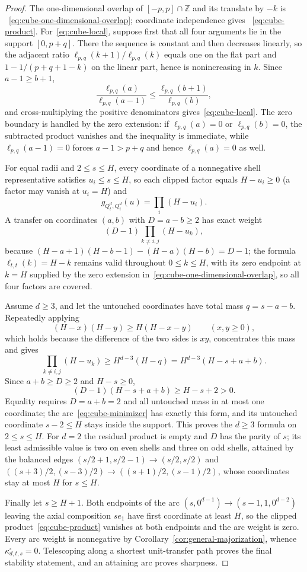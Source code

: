\documentclass[pdflatex,sn-mathphys-num]{sn-jnl}
\theoremstyle{thmstyleone}
\theoremstyle{thmstylethree}
\theoremstyle{thmstyletwo}
\newcommand{\Z}{\mathbb Z}
\begin{document}
\begin{proof}
The one-dimensional overlap of $[-p,p]\cap\Z$ and its translate by $-k$ is
~\eqref{eq:cube-one-dimensional-overlap}; coordinate independence gives
~\eqref{eq:cube-product}.  For~\eqref{eq:cube-local}, suppose first that all
four arguments lie in the support $[0,p+q]$.  There the sequence is constant
and then decreases linearly, so the adjacent ratio
$\ell_{p,q}(k+1)/\ell_{p,q}(k)$ equals one on the flat part and
$1-1/(p+q+1-k)$ on the linear part, hence is nonincreasing in $k$.  Since
$a-1\ge b+1$,
\[
 \frac{\ell_{p,q}(a)}{\ell_{p,q}(a-1)}
 \le\frac{\ell_{p,q}(b+1)}{\ell_{p,q}(b)},
\]
and cross-multiplying the positive denominators gives~\eqref{eq:cube-local}.
The zero boundary is handled by the zero extension: if $\ell_{p,q}(a)=0$ or
$\ell_{p,q}(b)=0$, the subtracted product vanishes and the inequality is
immediate, while $\ell_{p,q}(a-1)=0$ forces $a-1>p+q$ and hence
$\ell_{p,q}(a)=0$ as well.

For equal radii and $2\le s\le H$, every coordinate of a nonnegative shell
representative satisfies $u_i\le s\le H$, so each clipped factor equals
$H-u_i\ge0$ (a factor may vanish at $u_i=H$) and
\[
 g_{Q_t^d,Q_t^d}(u)=\prod_i(H-u_i).
\]
A transfer on coordinates $(a,b)$
with $D=a-b\ge2$ has exact weight
\begin{equation}
 (D-1)\prod_{k\ne i,j}(H-u_k),                       \label{eq:cube-edge-weight}
\end{equation}
because
$(H-a+1)(H-b-1)-(H-a)(H-b)=D-1$; the formula $\ell_{t,t}(k)=H-k$ remains
valid throughout $0\le k\le H$, with its zero endpoint at $k=H$ supplied by
the zero extension in~\eqref{eq:cube-one-dimensional-overlap}, so all four
factors are covered.

Assume $d\ge3$, and let the untouched coordinates have total mass
$q=s-a-b$.  Repeatedly applying
\[
 (H-x)(H-y)\ge H(H-x-y)
 \qquad(x,y\ge0),
\]
which holds because the difference of the two sides is $xy$,
concentrates this mass and gives
\[
 \prod_{k\ne i,j}(H-u_k)
 \ge H^{d-3}(H-q)=H^{d-3}(H-s+a+b).
\]
Since $a+b\ge D\ge2$ and $H-s\ge0$,
\[
 (D-1)(H-s+a+b)\ge H-s+2>0.
\]
Equality requires $D=a+b=2$ and all untouched mass in at most one coordinate;
the arc~\eqref{eq:cube-minimizer} has exactly this form, and its untouched
coordinate $s-2\le H$ stays inside the support.  This proves the
$d\ge3$ formula on $2\le s\le H$.  For $d=2$ the residual product is empty
and $D$ has the parity of $s$; its least admissible value is two on even
shells and three on odd shells, attained by the balanced edges
$(s/2+1,s/2-1)\to(s/2,s/2)$ and
$((s+3)/2,(s-3)/2)\to((s+1)/2,(s-1)/2)$, whose coordinates stay at most
$H$ for $s\le H$.

Finally let $s\ge H+1$.  Both endpoints of the arc
$(s,0^{d-1})\to(s-1,1,0^{d-2})$ leaving the axial composition $se_1$ have
first coordinate at least $H$, so the
clipped product~\eqref{eq:cube-product} vanishes at both endpoints and the
arc weight is zero.  Every arc weight is nonnegative by
Corollary~\ref{cor:general-majorization}, whence
$\kappa^\square_{d,t,s}=0$.  Telescoping along a shortest unit-transfer path
proves the final stability statement, and an attaining arc proves sharpness.
\end{proof}
\end{document}
